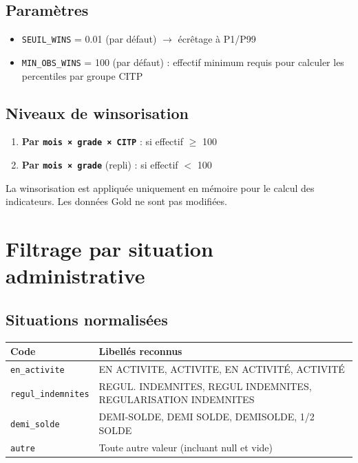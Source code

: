 \documentclass[12pt,a4paper,french]{article}
\newcommand{\colname}[1]{\texttt{#1}}
\begin{document}
\subsection{Paramètres}

\begin{itemize}
    \item \colname{SEUIL\_WINS} = 0.01 (par défaut) $\rightarrow$ écrêtage à P1/P99
    \item \colname{MIN\_OBS\_WINS} = 100 (par défaut) : effectif minimum requis
          pour calculer les percentiles par groupe CITP
\end{itemize}

\subsection{Niveaux de winsorisation}

\begin{enumerate}
    \item \textbf{Par \texttt{mois × grade × CITP}} : si effectif $\geq$ 100
    \item \textbf{Par \texttt{mois × grade}} (repli) : si effectif $<$ 100
\end{enumerate}

\begin{infobox}
    La winsorisation est appliquée uniquement en mémoire pour le calcul
    des indicateurs. Les données Gold ne sont pas modifiées.
\end{infobox}

\section{Filtrage par situation administrative}

\subsection{Situations normalisées}

\begin{tabularx}{\textwidth}{lX}
    \toprule
    \textbf{Code} & \textbf{Libellés reconnus} \\
    \midrule
    \texttt{en\_activite} & EN ACTIVITE, ACTIVITE, EN ACTIVITÉ, ACTIVITÉ \\
    \texttt{regul\_indemnites} & REGUL. INDEMNITES, REGUL INDEMNITES,
                                  REGULARISATION INDEMNITES \\
    \texttt{demi\_solde} & DEMI-SOLDE, DEMI SOLDE, DEMISOLDE, 1/2 SOLDE \\
    \texttt{autre} & Toute autre valeur (incluant null et vide) \\
    \bottomrule
\end{tabularx}
\end{document}
